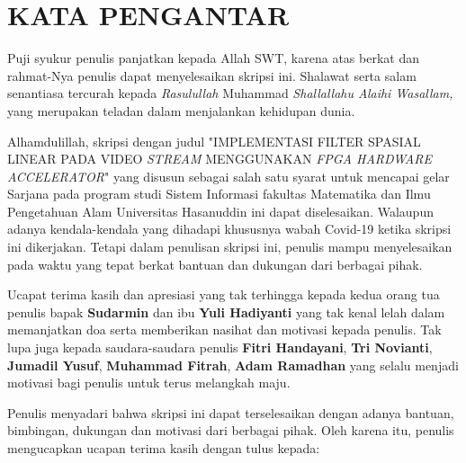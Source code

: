 \chapter*{KATA PENGANTAR}

Puji syukur penulis panjatkan kepada Allah SWT, karena atas berkat dan rahmat-Nya penulis dapat menyelesaikan skripsi ini. Shalawat serta salam senantiasa tercurah kepada \textit{Rasulullah} Muhammad \textit{Shallallahu Alaihi Wasallam,} yang merupakan teladan dalam menjalankan kehidupan dunia.

Alhamdulillah, skripsi dengan judul "IMPLEMENTASI FILTER SPASIAL LINEAR PADA VIDEO \textit{STREAM} MENGGUNAKAN \textit{FPGA HARDWARE ACCELERATOR}" yang disusun sebagai salah satu syarat untuk mencapai gelar Sarjana pada program studi Sistem Informasi fakultas Matematika dan Ilmu Pengetahuan Alam Universitas Hasanuddin ini dapat diselesaikan. Walaupun adanya kendala-kendala yang dihadapi khususnya wabah Covid-19 ketika skripsi ini dikerjakan. Tetapi dalam penulisan skripsi ini, penulis mampu menyelesaikan pada waktu yang tepat berkat bantuan dan dukungan dari berbagai pihak. 

Ucapat terima kasih dan apresiasi yang tak terhingga kepada kedua orang tua penulis bapak \textbf{Sudarmin} dan ibu \textbf{Yuli Hadiyanti} yang tak kenal lelah dalam memanjatkan doa serta memberikan nasihat dan motivasi kepada penulis. Tak lupa juga kepada saudara-saudara penulis \textbf{Fitri Handayani}, \textbf{Tri Novianti}, \textbf{Jumadil Yusuf}, \textbf{Muhammad Fitrah}, \textbf{Adam Ramadhan} yang selalu menjadi motivasi bagi penulis untuk terus melangkah maju.

Penulis menyadari bahwa skripsi ini dapat terselesaikan dengan adanya bantuan, bimbingan, dukungan dan motivasi dari berbagai pihak. Oleh karena itu, penulis mengucapkan ucapan terima kasih dengan tulus kepada:

